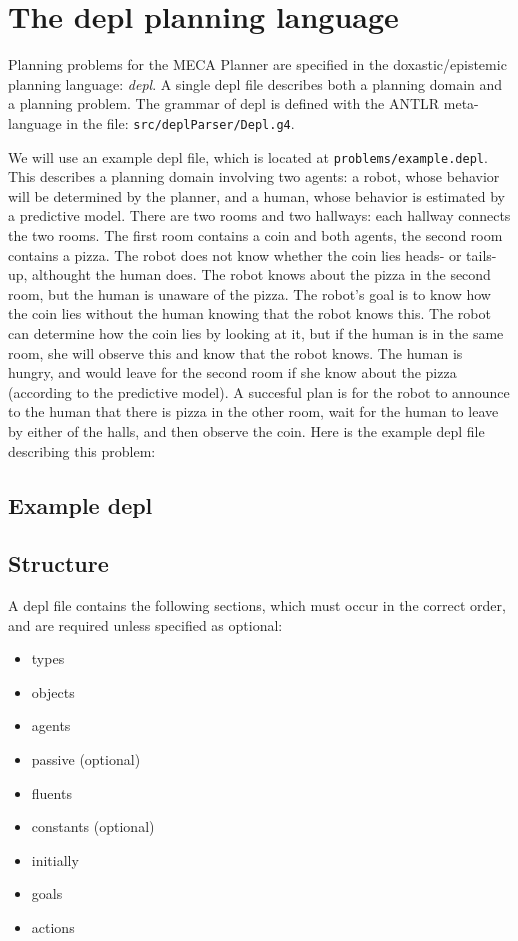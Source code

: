 \documentclass{article}
\begin{document}
\section{The depl planning language}

Planning problems for the MECA Planner are specified in the doxastic/epistemic
planning language: \emph{depl}. A single depl file describes both a planning domain
and a planning problem.
The grammar of depl is defined with the ANTLR meta-language in the file:
\texttt{src/deplParser/Depl.g4}.

We will use an example depl file, which is located at 
\texttt{problems/example.depl}.
This describes a planning domain involving two agents: a robot, whose behavior
will be determined by the planner, and a human, whose behavior is
estimated by a predictive model. There are two rooms and two hallways: each
hallway connects the two rooms. The first room contains a coin and both agents,
the second room contains a pizza. The robot does not know whether the coin lies
heads- or tails-up, althought the human does. The robot knows about the pizza in
the second room, but the human is unaware of the pizza.
The robot's goal is to know how the coin lies without the human knowing that the
robot knows this.
The robot can determine
how the coin lies by looking at it, but if the human is in the same room, she
will observe this and know that the robot knows. The human is hungry, and would
leave for the second room if she know about the pizza (according to the
predictive model).
A succesful plan is for the robot to announce to the human that there is pizza
in the other room, wait for the human to leave by either of the halls, and then
observe the coin. Here is the example depl file describing this problem:

\subsection{Example depl}





\subsection{Structure}

A depl file contains the following sections, which must occur in the correct
order, and are required unless specified as optional:

\begin{itemize}
\item types
\item objects
\item agents
\item passive (optional)
\item fluents
\item constants (optional)
\item initially
\item goals
\item actions
\end{itemize}
\end{document}
